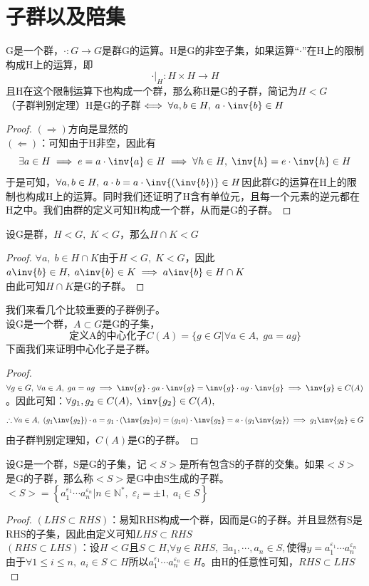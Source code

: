 \section{子群以及陪集}

G是一个群，$\cdot \colon G\to G$是群G的运算。H是G的非空子集，如果运算“$\cdot$”在H上的限制构成H上的运算，即
\[
\cdot |_{H} \colon H\times H\to H
\]
且H在这个限制运算下也构成一个群，那么称H是G的子群，简记为$H< G$\\
（子群判别定理）H是G的子群$\iff \forall a,b\in H,\; a\cdot \inv{b}\in H$
\begin{proof}
$(\Rightarrow)$方向是显然的\\
$(\Leftarrow)$：可知由于H非空，因此有
\[
\exists a\in H\implies e=a\cdot \inv{a}\in H\implies \forall h\in H ,\; \inv{h}=e\cdot\inv{h}\in H
\]
于是可知，$\forall a,b\in H,\; a\cdot b=a\cdot \inv{(\inv{b})}\in H$因此群G的运算在H上的限制也构成H上的运算。同时我们还证明了H含有单位元，且每一个元素的逆元都在H之中。我们由群的定义可知H构成一个群，从而是G的子群。
\end{proof}
设G是群，$H<G,\; K<G$，那么$H\cap K<G$
\begin{proof}
$\forall a,\;b\in H\cap K$由于$H<G,\; K<G$，因此$a\inv{b}\in H,\; a\inv{b}\in K\implies a\inv{b}\in H\cap K$\\
由此可知$H\cap K$是G的子群。
\end{proof}
我们来看几个比较重要的子群例子。\\
设G是一个群，$A\subset G$是G的子集，
\[
\text{定义A的中心化子}C(A)=\{g\in G|\forall a\in A,\; ga=ag\}
\]
下面我们来证明中心化子是子群。
\begin{proof}
$\forall g\in G,\; \forall a \in A,\; ga=ag \implies \inv{g}\cdot ga\cdot\inv{g}=\inv{g}\cdot ag\cdot\inv{g}\implies \inv{g}\in C(A)$。因此可知：$\forall g_1,g_2\in C(A),\; \inv{g_2}\in C(A),$
\[
\therefore \forall a\in A,\; (g_1 \inv{g_2})\cdot a=g_1\cdot(\inv{g_2}a)=(g_1a)\cdot \inv{g_2}=a\cdot(g_1\inv{g_2})\implies g_1\inv{g_2}\in G
\]
由子群判别定理知，$C(A)$是G的子群。
\end{proof}
设G是一个群，S是G的子集，记$<S>$是所有包含S的子群的交集。如果$<S>$是G的子群，那么称$<S>$是G中由S生成的子群。\\
$<S>=\left\{a_1^{\varepsilon_1}\cdots a_n^{\varepsilon_n}|n\in \mathbb{N}^*,\; \varepsilon_i=\pm 1,\; a_i\in S\right\}$
\begin{proof}
$(LHS\subset RHS)$：易知RHS构成一个群，因而是G的子群。并且显然有S是RHS的子集，因此由定义可知$LHS\subset RHS$\\
$(RHS\subset LHS)$：设$H<G$且$S\subset H$,\;$\forall y\in RHS,\; \exists a_1,\cdots,a_n\in S,\text{使得}y=a_1^{\varepsilon_1}\cdots a_n^{\varepsilon_n}$\\
由于$\forall 1\leq i \leq n,\; a_i\in S\subset H$所以$a_1^{\varepsilon_1}\cdots a_n^{\varepsilon_n}\in H$。由H的任意性可知，$RHS\subset LHS$
\end{proof}
